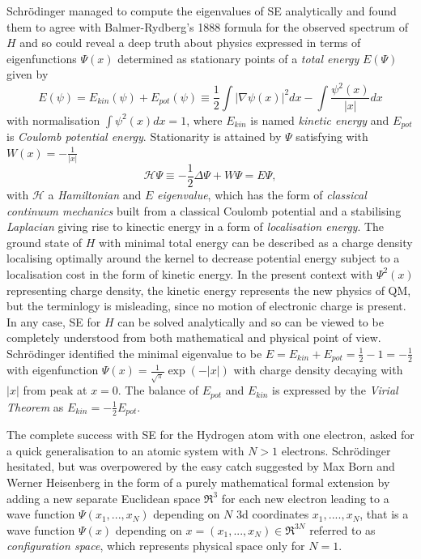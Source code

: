 \documentclass[11pt]{article} %
\begin{document}
Schr\"odinger managed to compute the eigenvalues of SE analytically and found them to agree with Balmer-Rydberg's 1888 formula for the observed spectrum of $H$ and so could reveal a deep truth about physics expressed in terms of eigenfunctions $\Psi (x)$ determined as stationary points of a \emph{total energy} $E(\Psi )$ given by
\begin{equation}
E(\psi ) = E_{kin}(\psi )+E_{pot}(\psi ) \equiv \frac{1}{2}\int\vert\nabla\psi (x)\vert^2dx -\int \frac{\psi^2(x)}{\vert x\vert}dx
\end{equation}
 with normalisation $\int\psi^2(x)dx=1$,  where $E_{kin}$ is named \emph{kinetic energy} and $E_{pot}$ is \emph{Coulomb potential energy}.  Stationarity is attained by $\Psi$ satisfying with $W(x)=-\frac{1}{\vert x\vert}$
\begin{equation}
\mathcal{H}\Psi\equiv  -\frac{1}{2}\Delta\Psi +W\Psi = E\Psi, 
\end{equation}
with $\mathcal{H}$ a \emph{Hamiltonian} and $E$ \emph{eigenvalue},  which has the form of \emph{classical continuum mechanics} built from a classical Coulomb potential and a stabilising \emph{Laplacian} giving rise to kinectic energy in a form of  \emph{localisation energy}.  The ground state of $H$ with minimal total energy can be described as a charge density localising optimally around the kernel to decrease potential energy subject to a localisation cost in the form of kinetic energy.  In the present context with $\Psi^2(x)$ representing charge density,  the kinetic energy represents the new physics of QM,  but the terminlogy is misleading,  since no motion of electronic charge  is present.  In any case,  SE for $H$ can be solved analytically and so can be viewed to be completely understood from both mathematical and physical point of view.  Schr\"odinger identified the minimal eigenvalue to be $E=E_{kin}+E_{pot}=\frac{1}{2}-1=-\frac{1}{2}$ with eigenfunction $\Psi (x)=\frac{1}{\sqrt{\pi}}\exp(-\vert x\vert)$ with charge density decaying with $\vert x\vert$ from peak at $x=0$.  The balance of $E_{pot}$ and $E_{kin}$ is expressed by the \emph{Virial Theorem} as $E_{kin} =-\frac{1}{2}E_{pot}$. 

The complete success with SE for the Hydrogen atom with one electron,  asked for a quick generalisation to an atomic system with $N>1$ electrons.  Schr\"odinger hesitated,  but was overpowered by the easy catch suggested by Max Born and Werner Heisenberg in the form of a purely mathematical formal extension by adding a new separate Euclidean space $\Re^3$ for each new electron leading to a wave function $\Psi (x_1,...,x_N )$ depending on $N$ 3d coordinates $x_1,....,x_N$,  that is a wave function $\Psi (x)$ depending on $x=(x_1,...,x_N)\in\Re^{3N}$ referred to as \emph{configuration space},  which represents physical space only for $N=1$.
\end{document}
